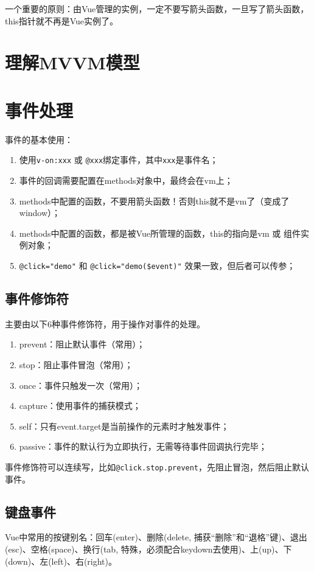 一个重要的原则：由Vue管理的实例，一定不要写箭头函数，一旦写了箭头函数，this指针就不再是Vue实例了。

\section{理解MVVM模型}

\section{事件处理}
事件的基本使用：
\begin{enumerate}
    \item 使用\verb|v-on:xxx| 或 \verb|@xxx|绑定事件，其中\verb|xxx|是事件名；
    \item 事件的回调需要配置在methods对象中，最终会在vm上；
    \item methods中配置的函数，不要用箭头函数！否则this就不是vm了（变成了window）；
    \item methods中配置的函数，都是被Vue所管理的函数，this的指向是vm 或 组件实例对象；
    \item \verb|@click="demo"| 和 \verb|@click="demo($event)"| 效果一致，但后者可以传参；
\end{enumerate}

\subsection{事件修饰符}
主要由以下6种事件修饰符，用于操作对事件的处理。
\begin{enumerate}
    \item prevent：阻止默认事件（常用）；
    \item stop：阻止事件冒泡（常用）；
    \item once：事件只触发一次（常用）；
    \item capture：使用事件的捕获模式；
    \item self：只有event.target是当前操作的元素时才触发事件；
    \item passive：事件的默认行为立即执行，无需等待事件回调执行完毕；
\end{enumerate}

事件修饰符可以连续写，比如\verb|@click.stop.prevent|，先阻止冒泡，然后阻止默认事件。

\subsection{键盘事件}
Vue中常用的按键别名：回车(enter)、删除(delete, 捕获“删除”和“退格”键)、退出(esc)、空格(space)、换行(tab, 特殊，必须配合keydown去使用)、上(up)、下(down)、左(left)、右(right)。

